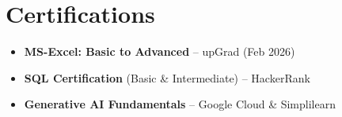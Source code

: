 \documentclass[10pt]{article}
\begin{document}
\section{Certifications}
\begin{itemize}
    \item \textbf{MS-Excel: Basic to Advanced} -- upGrad (Feb 2026)
    \item \textbf{SQL Certification} (Basic \& Intermediate) -- HackerRank
    \item \textbf{Generative AI Fundamentals} -- Google Cloud \& Simplilearn
\end{itemize}
\end{document}
